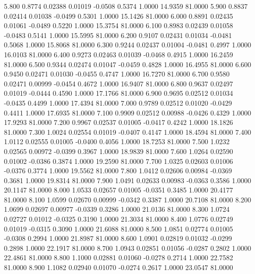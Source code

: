    5.800   0.8774   0.02388   0.01019  -0.0508   0.5374   1.0000  14.9359  81.0000
   5.900   0.8837   0.02414   0.01038  -0.0499   0.5301   1.0000  15.1426  81.0000
   6.000   0.8891   0.02435   0.01061  -0.0489   0.5220   1.0000  15.3754  81.0000
   6.100   0.8983   0.02439   0.01058  -0.0483   0.5141   1.0000  15.5995  81.0000
   6.200   0.9107   0.02431   0.01034  -0.0481   0.5068   1.0000  15.8068  81.0000
   6.300   0.9244   0.02437   0.01004  -0.0481   0.4997   1.0000  16.0103  81.0000
   6.400   0.9273   0.02463   0.01039  -0.0468   0.4915   1.0000  16.2459  81.0000
   6.500   0.9344   0.02474   0.01047  -0.0459   0.4828   1.0000  16.4955  81.0000
   6.600   0.9450   0.02471   0.01030  -0.0455   0.4747   1.0000  16.7270  81.0000
   6.700   0.9580   0.02471   0.00999  -0.0454   0.4672   1.0000  16.9407  81.0000
   6.800   0.9637   0.02497   0.01019  -0.0444   0.4590   1.0000  17.1766  81.0000
   6.900   0.9695   0.02512   0.01034  -0.0435   0.4499   1.0000  17.4394  81.0000
   7.000   0.9789   0.02512   0.01020  -0.0429   0.4411   1.0000  17.6935  81.0000
   7.100   0.9909   0.02512   0.00988  -0.0426   0.4329   1.0000  17.9293  81.0000
   7.200   0.9967   0.02537   0.01005  -0.0417   0.4242   1.0000  18.1826  81.0000
   7.300   1.0024   0.02554   0.01019  -0.0407   0.4147   1.0000  18.4594  81.0000
   7.400   1.0112   0.02555   0.01005  -0.0400   0.4056   1.0000  18.7253  81.0000
   7.500   1.0232   0.02565   0.00972  -0.0399   0.3967   1.0000  18.9839  81.0000
   7.600   1.0264   0.02590   0.01002  -0.0386   0.3874   1.0000  19.2590  81.0000
   7.700   1.0325   0.02603   0.01006  -0.0376   0.3774   1.0000  19.5562  81.0000
   7.800   1.0412   0.02606   0.00984  -0.0369   0.3681   1.0000  19.8314  81.0000
   7.900   1.0491   0.02633   0.00983  -0.0363   0.3586   1.0000  20.1147  81.0000
   8.000   1.0533   0.02657   0.01005  -0.0351   0.3485   1.0000  20.4177  81.0000
   8.100   1.0599   0.02670   0.00999  -0.0342   0.3387   1.0000  20.7108  81.0000
   8.200   1.0699   0.02697   0.00977  -0.0339   0.3286   1.0000  21.0136  81.0000
   8.300   1.0724   0.02727   0.01012  -0.0325   0.3190   1.0000  21.3034  81.0000
   8.400   1.0776   0.02749   0.01019  -0.0315   0.3090   1.0000  21.6088  81.0000
   8.500   1.0851   0.02774   0.01005  -0.0308   0.2994   1.0000  21.8987  81.0000
   8.600   1.0901   0.02819   0.01032  -0.0299   0.2898   1.0000  22.1917  81.0000
   8.700   1.0943   0.02851   0.01056  -0.0287   0.2802   1.0000  22.4861  81.0000
   8.800   1.1000   0.02881   0.01060  -0.0278   0.2714   1.0000  22.7582  81.0000
   8.900   1.1082   0.02940   0.01070  -0.0274   0.2617   1.0000  23.0547  81.0000
